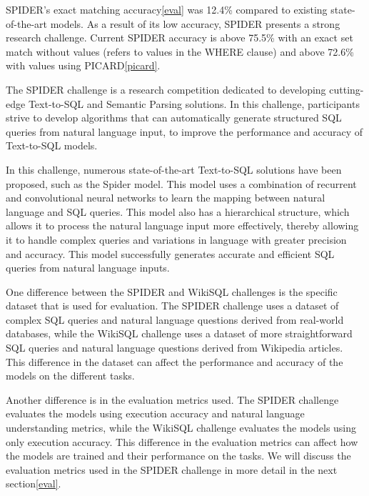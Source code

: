 SPIDER's exact matching accuracy\ref{eval} was 12.4\% compared to existing state-of-the-art models. As a result of its low accuracy, SPIDER presents a strong research challenge. Current SPIDER accuracy is above 75.5\% with an exact set match without values (refers to values in the WHERE clause) and above 72.6\% with values using PICARD\ref{picard}.

The SPIDER challenge is a research competition dedicated to developing cutting-edge Text-to-SQL and Semantic Parsing solutions. In this challenge, participants strive to develop algorithms that can automatically generate structured SQL queries from natural language input, to improve the performance and accuracy of Text-to-SQL models.

In this challenge, numerous state-of-the-art Text-to-SQL solutions have been proposed, such as the Spider model. This model uses a combination of recurrent and convolutional neural networks to learn the mapping between natural language and SQL queries. This model also has a hierarchical structure, which allows it to process the natural language input more effectively, thereby allowing it to handle complex queries and variations in language with greater precision and accuracy. This model successfully generates accurate and efficient SQL queries from natural language inputs.

One difference between the SPIDER and WikiSQL challenges is the specific dataset that is used for evaluation. The SPIDER challenge uses a dataset of complex SQL queries and natural language questions derived from real-world databases, while the WikiSQL challenge uses a dataset of more straightforward SQL queries and natural language questions derived from Wikipedia articles. This difference in the dataset can affect the performance and accuracy of the models on the different tasks.

Another difference is in the evaluation metrics used. The SPIDER challenge evaluates the models using execution accuracy and natural language understanding metrics, while the WikiSQL challenge evaluates the models using only execution accuracy. This difference in the evaluation metrics can affect how the models are trained and their performance on the tasks. We will discuss the evaluation metrics used in the SPIDER challenge in more detail in the next section\ref{eval}.
